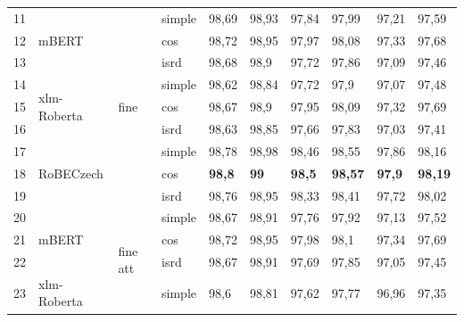 \begin{table}[!ht]
{\begin{tabular}{|l|l|l|l||llllll|}
11 & \multirow{3}{*}{mBERT} & \multirow{9}{*}{fine} & simple & 98,69 & 98,93 & 97,84 & 97,99 & 97,21 & 97,59 \\ \cline{1-1} \cline{4-10} 
12 &                              &                         & cos    & 98,72  & 98,95   & 97,97   & 98,08    & 97,33     & 97,68      \\ \cline{1-1} \cline{4-10} 
13 &                              &                         & isrd   & 98,68  & 98,9    & 97,72   & 97,86    & 97,09     & 97,46      \\ \cline{1-2} \cline{4-10} 
14 & \multirow{3}{*}{xlm-Roberta} &                         & simple & 98,62  & 98,84   & 97,72   & 97,9     & 97,07     & 97,48      \\ \cline{1-1} \cline{4-10} 
15 &                              &                         & cos    & 98,67  & 98,9    & 97,95   & 98,09    & 97,32     & 97,69      \\ \cline{1-1} \cline{4-10} 
16 &                              &                         & isrd   & 98,63  & 98,85   & 97,66   & 97,83    & 97,03     & 97,41      \\ \cline{1-2} \cline{4-10} 
17 & \multirow{3}{*}{RoBECzech}   &                         & simple & 98,78  & 98,98   & 98,46   & 98,55    & 97,86     & 98,16      \\ \cline{1-1} \cline{4-10} 
18 &                              &                         & cos    & \textbf{98,8}   & \textbf{99 }     & \textbf{98,5}    & \textbf{98,57}    & \textbf{97,9 }     & \textbf{98,19 }     \\ \cline{1-1} \cline{4-10} 
19 &                              &                         & isrd   & 98,76  & 98,95   & 98,33   & 98,41    & 97,72     & 98,02      \\ \cline{1-2} \cline{4-10} \hline
20 & \multirow{3}{*}{mBERT}       &      \multirow{9}{*}{fine att}                    & simple & 98,67  & 98,91   & 97,76   & 97,92    & 97,13     & 97,52      \\ \cline{1-1} \cline{4-10} 
21 &                              &                         & cos    & 98,72  & 98,95   & 97,98   & 98,1     & 97,34     & 97,69      \\ \cline{1-1} \cline{4-10} 
22 &                              &                         & isrd   & 98,67  & 98,91   & 97,69   & 97,85    & 97,05     & 97,45      \\ \cline{1-2} \cline{4-10} 
23 & \multirow{3}{*}{xlm-Roberta} &                         & simple & 98,6   & 98,81   & 97,62   & 97,77    & 96,96     & 97,35      \\ \cline{1-1} \cline{4-10} 

\end{tabular}}
\end{table}
